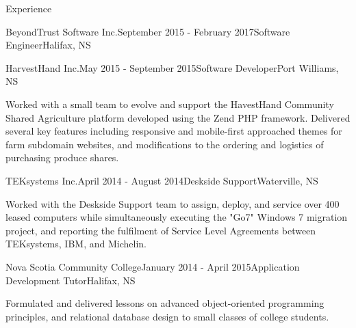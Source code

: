 \documentclass{resume} %
\begin{document}
\begin{rSection}{Experience}
\begin{rSubsection}{BeyondTrust Software Inc.}{September 2015 - February 2017}{Software Engineer}{Halifax, NS}
\end{rSubsection}



\begin{rSubsection}{HarvestHand Inc.}{May 2015 - September 2015}{Software Developer}{Port Williams, NS}

\item[] Worked with a small team to evolve and support the HavestHand Community Shared Agriculture platform developed using the Zend PHP framework. Delivered several key features including responsive and mobile-first approached themes for farm subdomain websites, and modifications to the ordering and logistics of purchasing produce shares.

\end{rSubsection}


\begin{rSubsection}{TEKsystems Inc.}{April 2014 - August 2014}{Deskside Support}{Waterville, NS}
\item[] Worked with the Deskside Support team to assign, deploy, and service over 400 leased computers while simultaneously executing the "Go7" Windows 7 migration project, and reporting the fulfilment of Service Level Agreements between TEKsystems, IBM, and Michelin.
\end{rSubsection}


\begin{rSubsection}{Nova Scotia Community College}{January 2014 - April 2015}{Application Development Tutor}{Halifax, NS}

\item[] Formulated and delivered lessons on advanced object-oriented programming principles, and relational database design to small classes of college students.
\end{rSubsection}


\end{rSection}

\pagebreak
\end{document}
